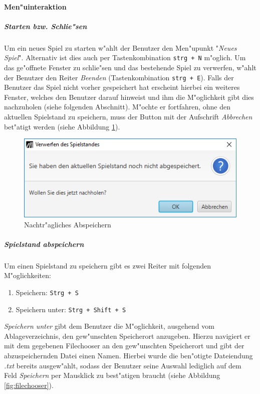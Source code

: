 \paragraph{Men"uinteraktion}
\subparagraph{Starten bzw. Schlie"sen}
Um ein neues Spiel zu starten w"ahlt der Benutzer den Men"upunkt "\emph{Neues Spiel}". Alternativ ist dies auch per Tastenkombination \verb|strg + N| m"oglich. Um das ge"offnete Fenster zu schlie"sen und das bestehende Spiel zu verwerfen, w"ahlt der Benutzer den Reiter \emph{Beenden} (Tastenkombination \verb|strg + E|). Falls der Benutzer das Spiel nicht vorher gespeichert hat erscheint hierbei ein weiteres Fenster, welches den Benutzer darauf hinweist und ihm die M"oglichkeit gibt dies nachzuholen (siehe folgenden Abschnitt). M"ochte er fortfahren, ohne den aktuellen Spielstand zu speichern, muss der Button mit der Aufschrift \emph{Abbrechen} bet"atigt werden (siehe Abbildung \ref{fig:nachtrSpeichern}). 

\begin{figure}
	\centering
	\includegraphics[width=.6\linewidth]{screenshots/screenshot_NachtraeglichesAbspeichern}
	\caption{Nachtr"agliches Abspeichern}
	\label{fig:nachtrSpeichern}
\end{figure}

\subparagraph{Spielstand abspeichern}
\label{spar:anleitung_speichern}
Um einen Spielstand zu speichern gibt es zwei Reiter mit folgenden M"oglichkeiten:
\begin{enumerate}
	\item Speichern: \verb|Strg + S|
	\item Speichern unter: \verb|Strg + Shift + S|
\end{enumerate}
\glqq \emph{Speichern unter}\grqq {} gibt dem Benutzer die M"oglichkeit, ausgehend vom Ablageverzeichnis, den gew"unschten Speicherort anzugeben. Hierzu navigiert er mit dem gegebenen Filechooser an den gew"unschten Speicherort und gibt der abzuspeichernden Datei einen Namen. Hierbei wurde die ben"otigte Dateiendung \emph{.txt} bereits ausgew"ahlt, sodass der Benutzer seine Auswahl lediglich auf dem Feld \emph{Speichern} per Mausklick zu best"atigen braucht (siehe Abbildung \ref{fig:filechooser}). 

